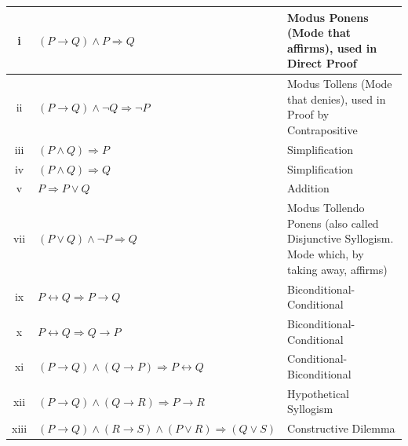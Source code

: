 \documentclass{article}
\begin{document}
	\begin{tabular}{|c|l|p{3in}|}
		\hline
		i  & $(P\rightarrow Q)\wedge P\Rightarrow Q$                                       & Modus Ponens (Mode that affirms), used in Direct Proof                                         \\ \hline
		ii   & $(P\rightarrow Q)\wedge \neg Q\Rightarrow \neg P$                             & Modus Tollens (Mode that denies), used in Proof by Contrapositive                              \\ \hline
		iii  & $(P\wedge Q)\Rightarrow P$                                                    & Simplification                                                                                 \\\hline
		iv   & $(P\wedge Q)\Rightarrow Q$                                                    & Simplification                                                                                 \\\hline
		v    & $P\Rightarrow P\vee Q$                                                        & Addition                                                                                       \\\hline
		vii  & $(P\vee Q)\wedge\neg P\Rightarrow Q$                                          & Modus Tollendo Ponens (also called Disjunctive Syllogism. Mode which, by taking away, affirms) \\\hline
		ix   & $P\leftrightarrow Q\Rightarrow P\rightarrow Q$                                & Biconditional-Conditional                                                                      \\\hline
		x    & $P\leftrightarrow Q\Rightarrow Q\rightarrow P$                                & Biconditional-Conditional                                                                      \\\hline
		xi   & $(P\rightarrow Q)\wedge(Q\rightarrow P)\Rightarrow P\leftrightarrow Q$        & Conditional-Biconditional                                                                      \\\hline
		xii  & $(P\rightarrow Q)\wedge (Q\rightarrow R)\Rightarrow P\rightarrow R$           & Hypothetical Syllogism                                                                         \\\hline
		xiii & $(P\rightarrow Q)\wedge (R\rightarrow S)\wedge(P\vee R)\Rightarrow (Q\vee S)$ & Constructive Dilemma\\\hline
	\end{tabular}
\end{document}
